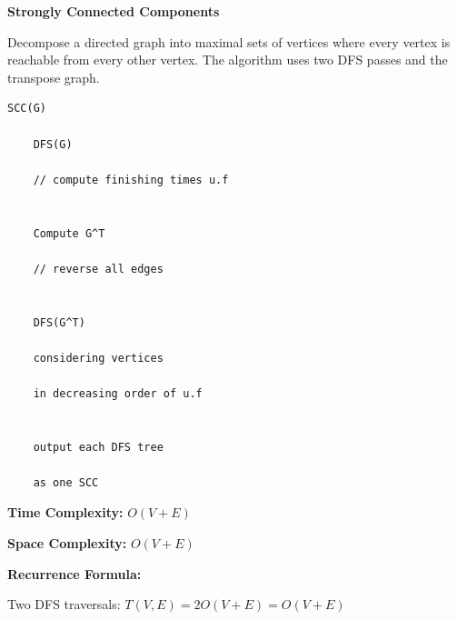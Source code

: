 \documentclass[a4paper,12pt]{article}
\begin{document}
\begin{tcolorbox}[
    colback=gray!30,
    colframe=black,
    boxrule=1pt,
    arc=0mm
]

\begin{tcolorbox}[
    colback=gray!10,
    colframe=black,
    arc=0mm
]
\centering
{\Huge\bfseries Strongly Connected Components}
\end{tcolorbox}


\begin{tcolorbox}[
    colback=gray!10,
    colframe=black,
    arc=0mm
]
\small
Decompose a directed graph into maximal sets of vertices where every
vertex is reachable from every other vertex.
The algorithm uses two DFS passes and the transpose graph.
\end{tcolorbox}


\begin{tcolorbox}[
    colback=black!5,
    colframe=black,
    arc=0mm,
    title=Pseudo-code
]
\tiny
\begin{lstlisting}
SCC(G)

    DFS(G)

    // compute finishing times u.f


    Compute G^T

    // reverse all edges


    DFS(G^T)

    considering vertices

    in decreasing order of u.f


    output each DFS tree

    as one SCC
\end{lstlisting}
\end{tcolorbox}


\begin{tcolorbox}[
    colback=cyan!20,
    colframe=black,
    arc=0mm
]
\small
\textbf{Time Complexity:}
$O(V+E)$
\end{tcolorbox}


\begin{tcolorbox}[
    colback=violet!20,
    colframe=black,
    arc=0mm
]
\small
\textbf{Space Complexity:}
$O(V+E)$
\end{tcolorbox}


\begin{tcolorbox}[
    colback=pink!20,
    colframe=black,
    arc=0mm
]
\small
\textbf{Recurrence Formula:}

Two DFS traversals:
$T(V,E)=2O(V+E)=O(V+E)$
\end{tcolorbox}

\end{tcolorbox}
\end{document}
